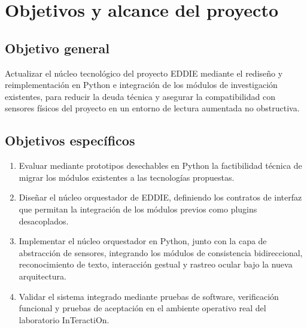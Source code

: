 

\section{Objetivos y alcance del proyecto}
\label{intro:objetivos}

\subsection{Objetivo general}
	Actualizar el núcleo tecnológico del proyecto EDDIE mediante el rediseño y reimplementación en Python e integración de los módulos de investigación existentes, para reducir la deuda técnica y asegurar la compatibilidad con sensores físicos del proyecto en un entorno de lectura aumentada no obstructiva.

\subsection{Objetivos espec\'ificos}
\begin{enumerate}
	\item Evaluar mediante prototipos desechables en Python la factibilidad técnica de migrar los módulos existentes a las tecnologías propuestas.
	\item Diseñar el núcleo orquestador de EDDIE, definiendo los contratos de interfaz que permitan la integración de los módulos previos como plugins desacoplados.
	\item Implementar el núcleo orquestador en Python, junto con la capa de abstracción de sensores, integrando los módulos de consistencia bidireccional, reconocimiento de texto, interacción gestual y rastreo ocular bajo la nueva arquitectura.
    \item Validar el sistema integrado mediante pruebas de software, verificación funcional y pruebas de aceptación en el ambiente operativo real del laboratorio InTeractiOn.
\end{enumerate}

